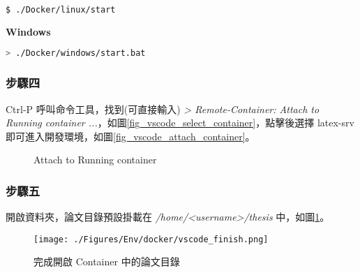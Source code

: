 \begin{lstlisting}[language=bash]
        $ ./Docker/linux/start
\end{lstlisting}

\begin{flushleft}
        \textbf{Windows}
\end{flushleft}

\begin{lstlisting}[language=bash]
        > ./Docker/windows/start.bat
\end{lstlisting}

\subsubsection*{步驟四}

Ctrl-P 呼叫命令工具，找到(可直接輸入) \emph{> Remote-Container: Attach to Running container ...}，如圖\ref{fig_vscode_select_container}，點擊後選擇 latex-srv 即可進入開發環境，如圖\ref{fig_vscode_attach_container}。

\begin{figure}[H] 
        \centering 
        \quad
        \centering 
        \caption{Attach to Running container}
\end{figure}

\subsubsection*{步驟五}

開啟資料夾，論文目錄預設掛載在 \emph{/home/<username>/thesis} 中，如圖\ref{fig_vscode_finish}。

\begin{figure}[H] 
        \centering 
        \texttt{[image: ./Figures/Env/docker/vscode\_finish.png]} 
        \caption{完成開啟 Container 中的論文目錄}
        \label{fig_vscode_finish}
\end{figure}
